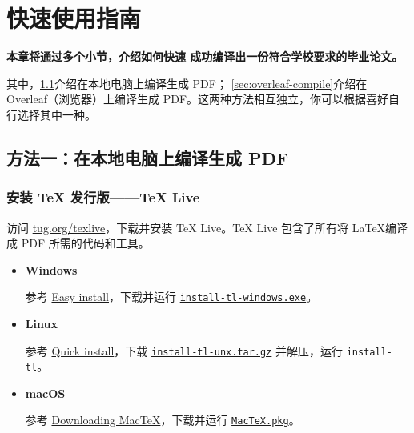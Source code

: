 \chapter{快速使用指南}
\label{ch:quick-start}

\textbf{本章将通过多个小节，介绍如何快速
成功编译出一份符合学校要求的毕业论文。}

其中，\cref{sec:local-compile}介绍在本地电脑上编译生成 PDF；
\cref{sec:overleaf-compile}介绍在 Overleaf（浏览器）上编译生成 PDF。这两种方法相互独立，你可以根据喜好自行选择其中一种。

\section{方法一：在本地电脑上编译生成 PDF}
\label{sec:local-compile}

\subsection{安装 TeX 发行版——TeX Live}

访问 \href{https://tug.org/texlive/}{tug.org/texlive}，下载并安装 TeX Live。TeX Live 包含了所有将 \LaTeX 编译成 PDF 所需的代码和工具。

\begin{itemize}[nosep]
  \item \textbf{Windows}
  
  参考 \href{https://www.tug.org/texlive/windows.html#install}{Easy install}，下载并运行 \href{https://mirror.ctan.org/systems/texlive/tlnet/install-tl-windows.exe}{\texttt{install-tl-windows.exe}}。
  
  \item \textbf{Linux}
  
  参考 \href{https://www.tug.org/texlive/quickinstall.html}{Quick install}，下载 \href{https://mirror.ctan.org/systems/texlive/tlnet/install-tl-unx.tar.gz}{\texttt{install-tl-unx.tar.gz}} 并解压，运行 \texttt{install-tl}。
  
  \item \textbf{macOS}
  
  参考 \href{https://www.tug.org/mactex/mactex-download.html}{Downloading MacTeX}，下载并运行 \href{https://mirror.ctan.org/systems/mac/mactex/MacTeX.pkg}{\texttt{MacTeX.pkg}}。
\end{itemize}

